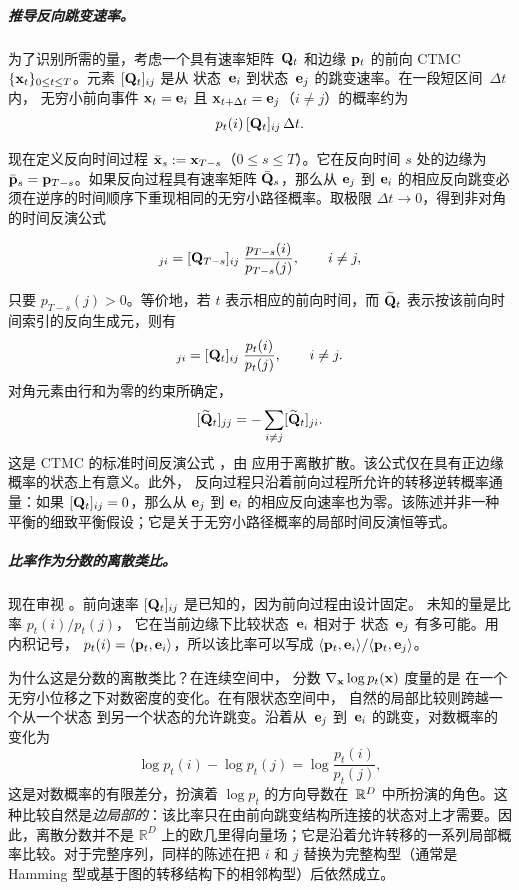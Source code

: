\subparagraph{推导反向跳变速率。}
为了识别所需的量，考虑一个具有速率矩阵~${\mathbf{Q}}_t$ 和边缘 ${\mathbf{p}}_t$ 的前向 CTMC $\{{\mathbf{x}}_t\}_{0\leq t\leq T}$。元素 $[{\mathbf{Q}}_t]_{ij}$ 是从
状态~${\mathbf{e}}_i$ 到状态~${\mathbf{e}}_j$ 的跳变速率。在一段短区间~$\Delta t$ 内，
无穷小前向事件
${\mathbf{x}}_t={\mathbf{e}}_i$ 且 ${\mathbf{x}}_{t+\Delta t}={\mathbf{e}}_j$（$i\neq j$）的概率约为
\[
p_t(i)\,[{\mathbf{Q}}_t]_{ij}\,\Delta t.
\]

现在定义反向时间过程 $\bar{{\mathbf{x}}}_s := {\mathbf{x}}_{T-s}$（$0\leq s\leq T$）。它在反向时间 $s$ 处的边缘为 $\bar{{\mathbf{p}}}_s={\mathbf{p}}_{T-s}$。如果反向过程具有速率矩阵 $\bar{{\mathbf{Q}}}_s$，那么从 ${\mathbf{e}}_j$ 到 ${\mathbf{e}}_i$ 的相应反向跳变必须在逆序的时间顺序下重现相同的无穷小路径概率。取极限 $\Delta t\to 0$，得到非对角的时间反演公式
\begin{mdframed}
\begin{equation}
[\bar{\rmQ}_s]_{ji}
= [\rmQ_{T-s}]_{ij}\;\frac{p_{T-s}(i)}{p_{T-s}(j)},
\qquad i \neq j,
\label{eq:reverse-rate-discrete-reverse-time}
\end{equation}
\end{mdframed}
只要 $p_{T-s}(j)>0$。等价地，若 $t$ 表示相应的前向时间，而 $\widetilde{{\mathbf{Q}}}_t$ 表示按该前向时间索引的反向生成元，则有
\begin{equation}
[\widetilde{\rmQ}_t]_{ji}
= [\rmQ_t]_{ij}\;\frac{p_t(i)}{p_t(j)},
\qquad i \neq j.
\label{eq:reverse-rate-discrete}
\end{equation}
对角元素由行和为零的约束所确定，
\[
[\widetilde{{\mathbf{Q}}}_t]_{jj}
=
-\sum_{i\neq j}[\widetilde{{\mathbf{Q}}}_t]_{ji}.
\]
这是 CTMC 的标准时间反演公式
\citep{kelly1979reversibility,anderson2012continuous}，由 \citet{campbell2022continuous} 应用于离散扩散。该公式仅在具有正边缘概率的状态上有意义。此外，
反向过程只沿着前向过程所允许的转移逆转概率通量：如果 $[{\mathbf{Q}}_t]_{ij}=0$，那么从 ${\mathbf{e}}_j$ 到 ${\mathbf{e}}_i$ 的相应反向速率也为零。该陈述并非一种平衡的细致平衡假设；它是关于无穷小路径概率的局部时间反演恒等式。

\subparagraph{比率作为分数的离散类比。}
现在审视 。前向速率
$[{\mathbf{Q}}_t]_{ij}$ 是已知的，因为前向过程由设计固定。
未知的量是比率 $p_t(i)/p_t(j)$，
它在当前边缘下比较状态~${\mathbf{e}}_i$ 相对于
状态~${\mathbf{e}}_j$ 有多可能。用内积记号，
$p_t(i) = \langle{\mathbf{p}}_t,{\mathbf{e}}_i\rangle$，所以该比率可以写成
$\langle{\mathbf{p}}_t,{\mathbf{e}}_i\rangle / \langle{\mathbf{p}}_t,{\mathbf{e}}_j\rangle$。

为什么这是分数的离散类比？在连续空间中，
分数 $\nabla_{{\mathbf{x}}}\log p_t({\mathbf{x}})$ 度量的是
在一个无穷小位移之下对数密度的变化。在有限状态空间中，
自然的局部比较则跨越一个从一个状态
到另一个状态的允许跳变。沿着从~${\mathbf{e}}_j$ 到~${\mathbf{e}}_i$ 的跳变，对数概率的变化为
\[
\log p_t(i) - \log p_t(j)
= \log \frac{p_t(i)}{p_t(j)},
\]
这是对数概率的有限差分，扮演着
$\log p_t$ 的方向导数在~$\mathbb{R}^D$ 中所扮演的角色。这种比较自然是\emph{边局部的}：该比率只在由前向跳变结构所连接的状态对上才需要。因此，离散分数并不是 $\mathbb{R}^D$ 上的欧几里得向量场；它是沿着允许转移的一系列局部概率比较。对于完整序列，同样的陈述在把 $i$ 和 $j$ 替换为完整构型（通常是 Hamming 型或基于图的转移结构下的相邻构型）后依然成立。

